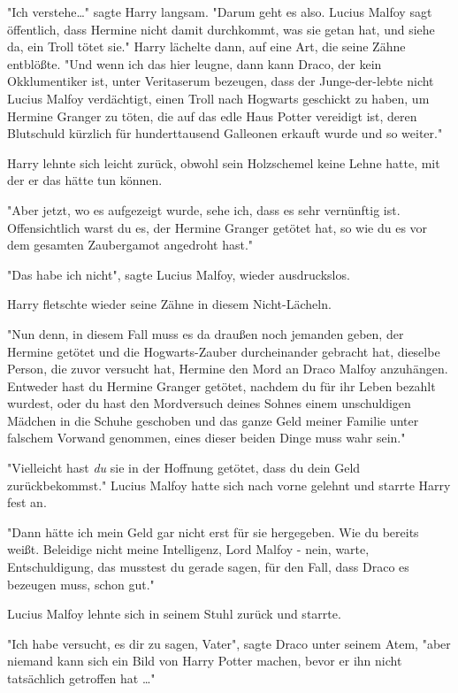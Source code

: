 {"Ich verstehe…" sagte Harry langsam. "Darum geht es also. Lucius Malfoy sagt öffentlich, dass Hermine nicht damit durchkommt, was sie getan hat, und siehe da, ein Troll tötet sie." Harry lächelte dann, auf eine Art, die seine Zähne entblößte. "Und wenn ich das hier leugne, dann kann Draco, der kein Okklumentiker ist, unter Veritaserum bezeugen, dass der Junge-der-lebte nicht Lucius Malfoy verdächtigt, einen Troll nach Hogwarts geschickt zu haben, um Hermine Granger zu töten, die auf das edle Haus Potter vereidigt ist, deren Blutschuld kürzlich für hunderttausend Galleonen erkauft wurde und so weiter."

Harry lehnte sich leicht zurück, obwohl sein Holzschemel keine Lehne hatte, mit der er das hätte tun können.

"Aber jetzt, wo es aufgezeigt wurde, sehe ich, dass es sehr vernünftig ist. Offensichtlich warst du es, der Hermine Granger getötet hat, so wie du es vor dem gesamten Zaubergamot angedroht hast."

"Das habe ich nicht", sagte Lucius Malfoy, wieder ausdruckslos.

Harry fletschte wieder seine Zähne in diesem Nicht-Lächeln.

"Nun denn, in diesem Fall muss es da draußen noch jemanden geben, der Hermine getötet und die Hogwarts-Zauber durcheinander gebracht hat, dieselbe Person, die zuvor versucht hat, Hermine den Mord an Draco Malfoy anzuhängen. Entweder hast du Hermine Granger getötet, nachdem du für ihr Leben bezahlt wurdest, oder du hast den Mordversuch deines Sohnes einem unschuldigen Mädchen in die Schuhe geschoben und das ganze Geld meiner Familie unter falschem Vorwand genommen, eines dieser beiden Dinge muss wahr sein."

"Vielleicht hast \emph{du} sie in der Hoffnung getötet, dass du dein Geld zurückbekommst." Lucius Malfoy hatte sich nach vorne gelehnt und starrte Harry fest an.

"Dann hätte ich mein Geld gar nicht erst für sie hergegeben. Wie du bereits weißt. Beleidige nicht meine Intelligenz, Lord Malfoy - nein, warte, Entschuldigung, das musstest du gerade sagen, für den Fall, dass Draco es bezeugen muss, schon gut."

Lucius Malfoy lehnte sich in seinem Stuhl zurück und starrte.

"Ich habe versucht, es dir zu sagen, Vater", sagte Draco unter seinem Atem, "aber niemand kann sich ein Bild von Harry Potter machen, bevor er ihn nicht tatsächlich getroffen hat …"

}
